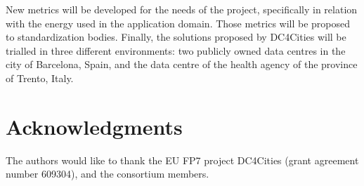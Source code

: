 \documentclass[conference]{IEEEtran}
\begin{document}
New metrics will be developed for the needs of the project, specifically in relation with the energy used in the application domain.
Those metrics will be proposed to standardization bodies.
Finally, the solutions proposed by DC4Cities will be trialled in three different environments: two publicly owned data centres in the city of Barcelona, Spain, and the data centre of the health agency of the province of Trento, Italy.


\section{Acknowledgments}
The authors would like to thank the EU FP7 project DC4Cities (grant agreement number 609304), and the consortium members.


 
\end{document}
